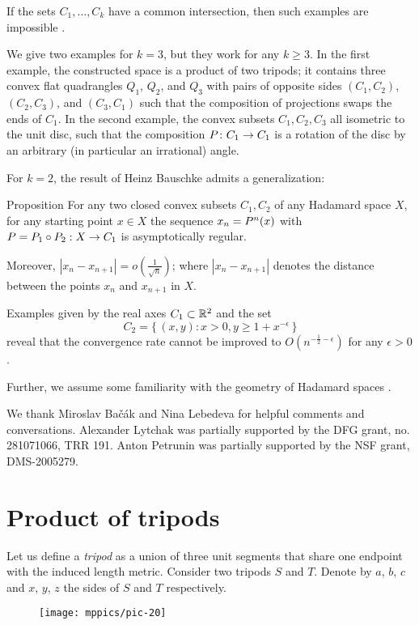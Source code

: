 \documentclass[a4paper,10pt]{article}
\begin{document}
If the sets $C_1,\dots,C_k$ have a common intersection, then such examples are impossible \cite{asymptotic,Bac2,Bac}.

We give two examples for $k=3$, but they work for any $k\ge 3$.
In the first example, the constructed space is a product of two tripods;
it contains three convex flat quadrangles $Q_1$, $Q_2$, and $Q_3$ with pairs of opposite sides $(C_1,C_2)$, $(C_2,C_3)$, and $(C_3,C_1)$ such that the composition of projections swaps the ends of $C_1$.
In the second example, the convex subsets $C_1,C_2,C_3$ all isometric to the unit disc, such that the composition $P\:C_1\z\to C_1$  is a rotation of the disc by an arbitrary (in particular an irrational) angle.
 
For $k=2$, the result of  Heinz Bauschke \cite{Bauschke} admits a generalization:

\begin{thm}{Proposition} \label{prop}
For any two closed convex subsets $C_1,C_2$ of any Hadamard space $X$, for any starting point $x\in X$  the sequence $x_n \z= P^n (x)$ with $P\z=  P_1\circ P_2 :X\to C_1$ is asymptotically  regular.

Moreover, 
$|x_n-x_{n+1}| =o (\frac  {1} {\sqrt n})$;
where $|x_n-x_{n+1}|$ denotes the distance between the points $x_n$ and $x_{n+1}$ in $X$.
\end{thm}

Examples given by the real axes $C_1 \subset \mathbb{R}^2$ and the set
\[C_2  = \{\,(x,y):x>0, y \geq 1+ x^{ -\epsilon}\,\}\]
reveal that the convergence rate cannot be improved to $O (n^{-\frac 1 2  -\epsilon})$ for any $\epsilon >0$.

\medskip

Further, we assume some familiarity with the geometry of Hadamard spaces \cite{BBI,BH,AKP,AKP_inv,ballmannbook}.

We thank Miroslav Bačák and Nina Lebedeva for helpful comments and conversations.
Alexander Lytchak was partially supported by the DFG grant, no. 281071066, TRR 191.
Anton Petrunin was partially supported by the NSF grant, DMS-2005279.

\section{Product of tripods}

Let us define a \emph{tripod} as a union of three unit segments that share one endpoint with the induced length metric.
Consider two tripods $S$ and $T$.
Denote by $a$, $b$, $c$ and $x$, $y$, $z$ the sides of $S$ and $T$ respectively.
\begin{figure}[h!]
\vskip0mm
\centering
\texttt{[image: mppics/pic-20]}
\end{figure}
\end{document}

